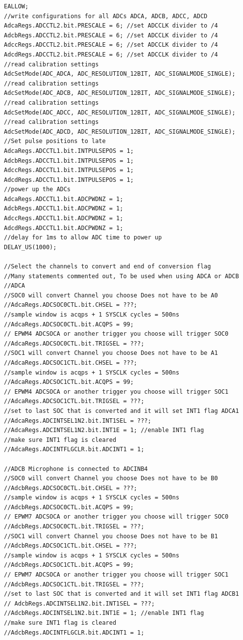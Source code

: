 \documentclass[11pt]{article}
\begin{document}
\begin{enumerate}
\begin{verbatim}
EALLOW;
//write configurations for all ADCs ADCA, ADCB, ADCC, ADCD
AdcaRegs.ADCCTL2.bit.PRESCALE = 6; //set ADCCLK divider to /4
AdcbRegs.ADCCTL2.bit.PRESCALE = 6; //set ADCCLK divider to /4
AdccRegs.ADCCTL2.bit.PRESCALE = 6; //set ADCCLK divider to /4
AdcdRegs.ADCCTL2.bit.PRESCALE = 6; //set ADCCLK divider to /4
//read calibration settings
AdcSetMode(ADC_ADCA, ADC_RESOLUTION_12BIT, ADC_SIGNALMODE_SINGLE);
//read calibration settings
AdcSetMode(ADC_ADCB, ADC_RESOLUTION_12BIT, ADC_SIGNALMODE_SINGLE);
//read calibration settings
AdcSetMode(ADC_ADCC, ADC_RESOLUTION_12BIT, ADC_SIGNALMODE_SINGLE);
//read calibration settings
AdcSetMode(ADC_ADCD, ADC_RESOLUTION_12BIT, ADC_SIGNALMODE_SINGLE);
//Set pulse positions to late
AdcaRegs.ADCCTL1.bit.INTPULSEPOS = 1;
AdcbRegs.ADCCTL1.bit.INTPULSEPOS = 1;
AdccRegs.ADCCTL1.bit.INTPULSEPOS = 1;
AdcdRegs.ADCCTL1.bit.INTPULSEPOS = 1;
//power up the ADCs
AdcaRegs.ADCCTL1.bit.ADCPWDNZ = 1;
AdcbRegs.ADCCTL1.bit.ADCPWDNZ = 1;
AdccRegs.ADCCTL1.bit.ADCPWDNZ = 1;
AdcdRegs.ADCCTL1.bit.ADCPWDNZ = 1;
//delay for 1ms to allow ADC time to power up
DELAY_US(1000);

//Select the channels to convert and end of conversion flag
//Many statements commented out, To be used when using ADCA or ADCB
//ADCA
//SOC0 will convert Channel you choose Does not have to be A0
//AdcaRegs.ADCSOC0CTL.bit.CHSEL = ???;
//sample window is acqps + 1 SYSCLK cycles = 500ns
//AdcaRegs.ADCSOC0CTL.bit.ACQPS = 99;
// EPWM4 ADCSOCA or another trigger you choose will trigger SOC0
//AdcaRegs.ADCSOC0CTL.bit.TRIGSEL = ???;
//SOC1 will convert Channel you choose Does not have to be A1
//AdcaRegs.ADCSOC1CTL.bit.CHSEL = ???;
//sample window is acqps + 1 SYSCLK cycles = 500ns
//AdcaRegs.ADCSOC1CTL.bit.ACQPS = 99;
// EPWM4 ADCSOCA or another trigger you choose will trigger SOC1
//AdcaRegs.ADCSOC1CTL.bit.TRIGSEL = ???;
//set to last SOC that is converted and it will set INT1 flag ADCA1
//AdcaRegs.ADCINTSEL1N2.bit.INT1SEL = ???;
//AdcaRegs.ADCINTSEL1N2.bit.INT1E = 1; //enable INT1 flag
//make sure INT1 flag is cleared
//AdcaRegs.ADCINTFLGCLR.bit.ADCINT1 = 1;

//ADCB Microphone is connected to ADCINB4
//SOC0 will convert Channel you choose Does not have to be B0
//AdcbRegs.ADCSOC0CTL.bit.CHSEL = ???;
//sample window is acqps + 1 SYSCLK cycles = 500ns
//AdcbRegs.ADCSOC0CTL.bit.ACQPS = 99;
// EPWM7 ADCSOCA or another trigger you choose will trigger SOC0
//AdcbRegs.ADCSOC0CTL.bit.TRIGSEL = ???;
//SOC1 will convert Channel you choose Does not have to be B1
//AdcbRegs.ADCSOC1CTL.bit.CHSEL = ???;
//sample window is acqps + 1 SYSCLK cycles = 500ns
//AdcbRegs.ADCSOC1CTL.bit.ACQPS = 99;
// EPWM7 ADCSOCA or another trigger you choose will trigger SOC1
//AdcbRegs.ADCSOC1CTL.bit.TRIGSEL = ???;
//set to last SOC that is converted and it will set INT1 flag ADCB1
// AdcbRegs.ADCINTSEL1N2.bit.INT1SEL = ???;
//AdcbRegs.ADCINTSEL1N2.bit.INT1E = 1; //enable INT1 flag
//make sure INT1 flag is cleared
//AdcbRegs.ADCINTFLGCLR.bit.ADCINT1 = 1;


\end{verbatim}
\end{enumerate}
\end{document}
